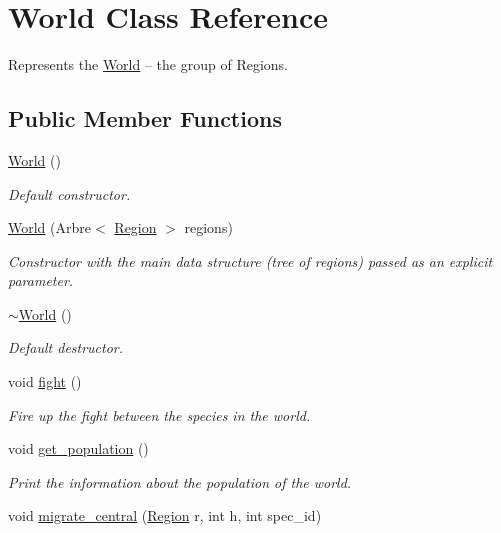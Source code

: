 \hypertarget{class_world}{\section{World Class Reference}
\label{class_world}
}


Represents the \hyperlink{class_world}{World} – the group of Regions.  


\subsection*{Public Member Functions}
\begin{DoxyCompactItemize}
\item 
\hyperlink{class_world_afa39d4e6f714a7a3691ac0c656f5e8a8}{World} ()
\begin{DoxyCompactList}\small\item\em Default constructor. \end{DoxyCompactList}\item 
\hyperlink{class_world_ad72ff99135a1f23fb7cfab1db0ac1ef3}{World} (Arbre$<$ \hyperlink{class_region}{Region} $>$ regions)
\begin{DoxyCompactList}\small\item\em Constructor with the main data structure (tree of regions) passed as an explicit parameter. \end{DoxyCompactList}\item 
\hyperlink{class_world_a8c73fba541a5817fff65147ba47cd827}{$\sim$\-World} ()
\begin{DoxyCompactList}\small\item\em Default destructor. \end{DoxyCompactList}\item 
void \hyperlink{class_world_a60f792899e98b54682755748f2576700}{fight} ()
\begin{DoxyCompactList}\small\item\em Fire up the fight between the species in the world. \end{DoxyCompactList}\item 
void \hyperlink{class_world_aeb43ebd4d41db15d1c20e186f0e8d743}{get\-\_\-population} ()
\begin{DoxyCompactList}\small\item\em Print the information about the population of the world. \end{DoxyCompactList}\item 
void \hyperlink{class_world_a186351586ccff8563f96fee8271e5dd6}{migrate\-\_\-central} (\hyperlink{class_region}{Region} r, int h, int spec\-\_\-id)

\end{DoxyCompactItemize}
